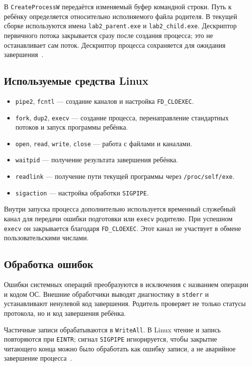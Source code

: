 В \texttt{CreateProcessW} передаётся изменяемый буфер командной строки. Путь к ребёнку определяется относительно исполняемого файла родителя. В текущей сборке используются имена \texttt{lab2\_parent.exe} и \texttt{lab2\_child.exe}. Дескриптор первичного потока закрывается сразу после создания процесса; это не останавливает сам поток. Дескриптор процесса сохраняется для ожидания завершения~\cite{winprocess}.

\subsection{Используемые средства Linux}
\begin{itemize}
\item \texttt{pipe2}, \texttt{fcntl} --- создание каналов и настройка \texttt{FD\_CLOEXEC}.
\item \texttt{fork}, \texttt{dup2}, \texttt{execv} --- создание процесса, перенаправление стандартных потоков и запуск программы ребёнка.
\item \texttt{open}, \texttt{read}, \texttt{write}, \texttt{close} --- работа с файлами и каналами.
\item \texttt{waitpid} --- получение результата завершения ребёнка.
\item \texttt{readlink} --- получение пути текущей программы через \texttt{/proc/self/exe}.
\item \texttt{sigaction} --- настройка обработки \texttt{SIGPIPE}.
\end{itemize}

Внутри запуска процесса дополнительно используется временный служебный канал для передачи ошибки подготовки или \texttt{execv} родителю. При успешном \texttt{execv} он закрывается благодаря \texttt{FD\_CLOEXEC}. Этот канал не участвует в обмене пользовательскими числами.

\subsection{Обработка ошибок}
Ошибки системных операций преобразуются в исключения с названием операции и кодом ОС. Внешние обработчики выводят диагностику в \texttt{stderr} и устанавливают ненулевой код завершения. Родитель проверяет не только статусы протокола, но и код завершения ребёнка.

Частичные записи обрабатываются в \texttt{WriteAll}. В Linux чтение и запись повторяются при \texttt{EINTR}; сигнал \texttt{SIGPIPE} игнорируется, чтобы закрытие читающего конца можно было обработать как ошибку записи, а не аварийное завершение процесса~\cite{linuxpipes}.
